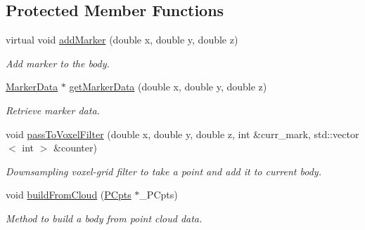 \subsection*{Protected Member Functions}
\begin{DoxyCompactItemize}
\item 
virtual void \hyperlink{class_body_aa965f7b498528230aa2f56a9abf6bf06}{add\+Marker} (double x, double y, double z)
\begin{DoxyCompactList}\small\item\em Add marker to the body. \end{DoxyCompactList}\item 
\hyperlink{class_marker_data}{Marker\+Data} $\ast$ \hyperlink{class_body_a530c704d7737af163c9ed06d42a373f0}{get\+Marker\+Data} (double x, double y, double z)
\begin{DoxyCompactList}\small\item\em Retrieve marker data. \end{DoxyCompactList}\item 
void \hyperlink{class_body_a8554d1d9ae99cc5f500f6266712339e3}{pass\+To\+Voxel\+Filter} (double x, double y, double z, int \&curr\+\_\+mark, std\+::vector$<$ int $>$ \&counter)
\begin{DoxyCompactList}\small\item\em Downsampling voxel-\/grid filter to take a point and add it to current body. \end{DoxyCompactList}\item 
void \hyperlink{class_body_a55d0e9759bcf50fdea300b2fe4520baf}{build\+From\+Cloud} (\hyperlink{class_p_cpts}{P\+Cpts} $\ast$\+\_\+\+P\+Cpts)
\begin{DoxyCompactList}\small\item\em Method to build a body from point cloud data. \end{DoxyCompactList}\end{DoxyCompactItemize}
